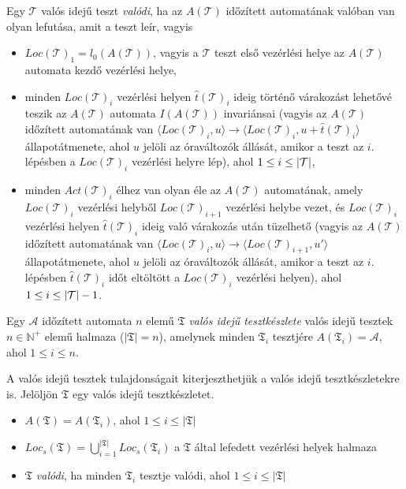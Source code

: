\begin{definition}
\label{ValódiTeszt}
Egy $\mathcal{T}$ valós idejű teszt \emph{valódi}, ha az $A(\mathcal{T})$ időzített automatának valóban van olyan lefutása, amit a teszt leír, vagyis 
\begin{itemize}
    \item $Loc(\mathcal{T})_1 = l_0(A(\mathcal{T}))$, vagyis a $\mathcal{T}$ teszt első vezérlési helye az $A(\mathcal{T})$ automata kezdő vezérlési helye,
    \item minden $Loc(\mathcal{T})_i$ vezérlési helyen $\hat{t}(\mathcal{T})_i$ ideig történő várakozást lehetővé teszik az $A(\mathcal{T})$ automata $I(A(\mathcal{T}))$ invariánsai (vagyis az $A(\mathcal{T})$ időzített automatának van $\langle Loc(\mathcal{T})_i, u \rangle \rightarrow \langle Loc(\mathcal{T})_i, u + \hat{t}(\mathcal{T})_i \rangle$ állapotátmenete, ahol $u$ jelöli az óraváltozók állását, amikor a teszt az $i$. lépésben a $Loc(\mathcal{T})_i$ vezérlési helyre lép), ahol $1 \leq i \leq |\mathcal{T}|$,
    \item minden $Act(\mathcal{T})_i$ élhez van olyan éle az $A(\mathcal{T})$ automatának, amely $Loc(\mathcal{T})_i$ vezérlési helyből $Loc(\mathcal{T})_{i+1}$ vezérlési helybe vezet, és $Loc(\mathcal{T})_i$ vezérlési helyen $\hat{t}(\mathcal{T})_i$ ideig való várakozás után tüzelhető (vagyis az $A(\mathcal{T})$ időzített automatának van $\langle Loc(\mathcal{T})_i, u \rangle \rightarrow \langle Loc(\mathcal{T})_{i+1}, u' \rangle$ állapotátmenete, ahol $u$ jelöli az óraváltozók állását, amikor a teszt az $i$. lépésben $\hat{t}(\mathcal{T})_i$ időt eltöltött a $Loc(\mathcal{T})_i$ vezérlési helyen), ahol $1 \leq i \leq |\mathcal{T}| - 1$.
\end{itemize}
\end{definition}

\begin{definition}
\label{Tesztkészlet}
Egy $\mathcal{A}$ időzített automata $n$ elemű $\mathfrak{T}$ \emph{valós idejű tesztkészlete} valós idejű tesztek $n \in \mathbb{N}^+$ elemű halmaza ($|\mathfrak{T}| = n$), amelynek minden $\mathfrak{T}_i$ tesztjére $A(\mathfrak{T}_i) = \mathcal{A}$, ahol $1 \leq i \leq n$.
\end{definition}

A valós idejű tesztek tulajdonságait kiterjeszthetjük a valós idejű tesztkészletekre is. Jelöljön $\mathfrak{T}$ egy valós idejű tesztkészletet.
\begin{itemize}
    \item $A(\mathfrak{T}) = A(\mathfrak{T}_i)$, ahol $1 \leq i \leq |\mathfrak{T}|$
    \item $Loc_s(\mathfrak{T}) = \bigcup\limits_{i = 1}^{|\mathfrak{T}|} Loc_s(\mathfrak{T}_i)$ a $\mathfrak{T}$ által lefedett vezérlési helyek halmaza
    \item $\mathfrak{T}$ \emph{valódi}, ha minden $\mathfrak{T}_i$ tesztje valódi, ahol $1 \leq i \leq |\mathfrak{T}|$
\end{itemize}

